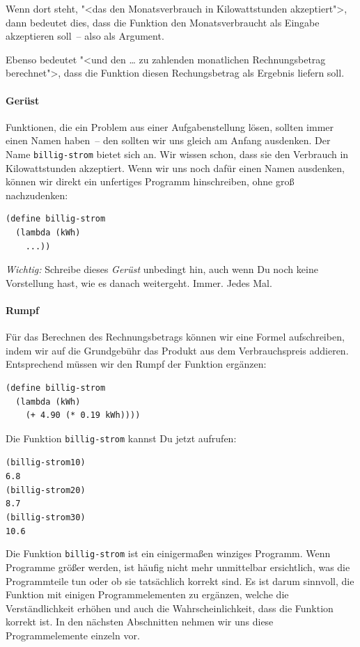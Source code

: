 Wenn dort steht, "<das den Monatsverbrauch in Kilowattstunden
akzeptiert">, dann bedeutet dies, dass die Funktion den
Monatsverbraucht als Eingabe akzeptieren soll~-- also als Argument.

Ebenso bedeutet "<und den \ldots{} zu zahlenden monatlichen
Rechnungsbetrag berechnet">, dass die Funktion diesen Rechungsbetrag
als Ergebnis liefern soll.

\paragraph{Gerüst}

Funktionen, die ein Problem aus einer Aufgabenstellung lösen, sollten
immer einen Namen haben~-- den sollten wir uns gleich am Anfang
ausdenken.  Der Name \texttt{billig-strom} bietet sich an.  Wir wissen
schon, dass sie den Verbrauch in Kilowattstunden akzeptiert.  Wenn wir
uns noch dafür einen Namen ausdenken, können wir direkt ein unfertiges
Programm hinschreiben, ohne groß nachzudenken:
%
\begin{verbatim}
(define billig-strom
  (lambda (kWh)
    ...))
\end{verbatim}
%
\emph{Wichtig:} Schreibe dieses \textit{Gerüst}
unbedingt hin, auch wenn Du noch keine Vorstellung hast, wie es danach
weitergeht.  Immer.  Jedes Mal.

\paragraph{Rumpf}

Für das Berechnen des Rechnungsbetrags können wir eine Formel
aufschreiben, indem wir auf die Grundgebühr das Produkt aus dem
Verbrauchspreis addieren.  Entsprechend müssen wir den Rumpf der
Funktion ergänzen:
%
\begin{verbatim}
(define billig-strom
  (lambda (kWh)
    (+ 4.90 (* 0.19 kWh))))
\end{verbatim}
%
Die Funktion \texttt{billig-strom} kannst Du jetzt aufrufen:
%
\begin{alltt}
(billig-strom 10)
\evalsto{} 6.8
(billig-strom 20)
\evalsto{} 8.7
(billig-strom 30)
\evalsto{} 10.6
\end{alltt}
%
Die Funktion \texttt{billig-strom} ist ein einigermaßen winziges
Programm.  Wenn Programme größer werden, ist häufig nicht mehr
unmittelbar ersichtlich, was die Programmteile tun oder ob sie
tatsächlich korrekt sind.  Es ist darum sinnvoll, die Funktion mit
einigen Programmelementen zu ergänzen, welche die Verständlichkeit
erhöhen und auch die Wahrscheinlichkeit, dass die Funktion korrekt
ist.  In den nächsten Abschnitten nehmen wir uns diese
Programmelemente einzeln vor.

